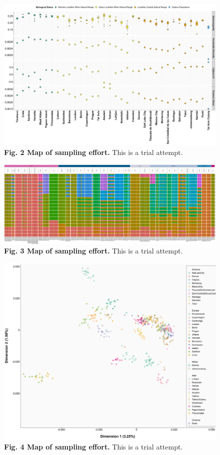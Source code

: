 \documentclass[twoside, british, a4paper]{article}
\begin{document}
\begin{figure}[!ht]
\centering
\includegraphics[scale=0.4]{../FPG--Plots/FPG--PopGenEstimates/FPG--PopGenEstimates.pdf}
\caption*{ \scriptsize \textbf{Fig. 2 Map of sampling effort.} This is a trial attempt.}
\label{MainText:FPGP--PopGenEstimates}
\end{figure}

\begin{figure}[!ht]
\centering
\includegraphics[scale=0.17]{../FPG--Plots/FPG--ngsAdmix/FPG--ngsAdmix.pdf}
\caption*{ \scriptsize \textbf{Fig. 3 Map of sampling effort.} This is a trial attempt.}
\label{MainText:FPG--ngsAdmix}
\end{figure}

\begin{figure}[!ht]
\centering
\includegraphics[scale=0.4]{../FPG--Plots/FPG--MDS/FPG--MDS.pdf}
\caption*{ \scriptsize \textbf{Fig. 4 Map of sampling effort.} This is a trial attempt.}
\label{MainText:FPG--MDS}
\end{figure}

\newpage
\clearpage

\printbibliography
\end{document}
